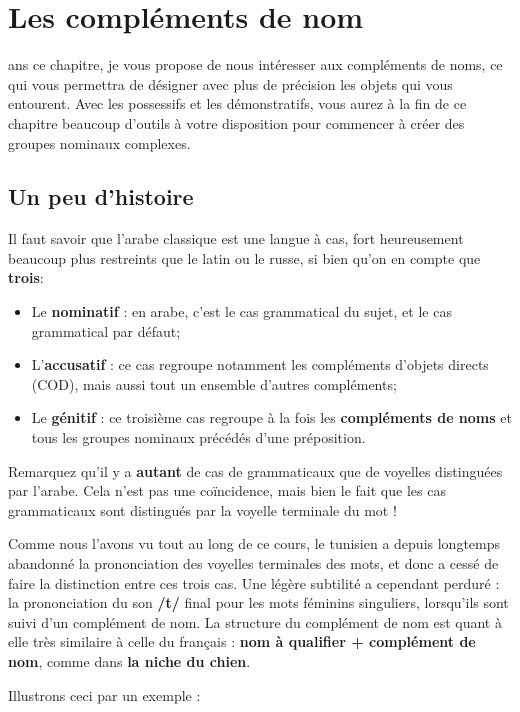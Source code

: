 \chapter{Les compléments de nom}
ans ce chapitre, je vous propose de nous intéresser aux compléments de noms, ce qui vous permettra de désigner avec plus de précision les objets qui vous entourent. Avec les possessifs et les démonstratifs, vous aurez à la fin de ce chapitre beaucoup d'outils à votre disposition pour commencer à créer des groupes nominaux complexes.

\section{Un peu d'histoire}
Il faut savoir que l'arabe classique est une langue à cas, fort heureusement beaucoup plus restreints que le latin ou le russe, si bien qu'on en compte que \textbf{trois}:

\begin{itemize}
    \item Le \textbf{nominatif} : en arabe, c'est le cas grammatical du sujet, et le cas grammatical par défaut;
    \item L'\textbf{accusatif} : ce cas regroupe notamment les compléments d'objets directs (COD), mais aussi tout un ensemble d'autres compléments;
    \item Le \textbf{génitif} : ce troisième cas regroupe à la fois les \textbf{compléments de noms} et tous les groupes nominaux précédés d'une préposition.
\end{itemize}

Remarquez qu'il y a \textbf{autant} de cas de grammaticaux que de voyelles distinguées par l'arabe. Cela n'est pas une coïncidence, mais bien le fait que les cas grammaticaux sont distingués par la voyelle terminale du mot !

Comme nous l'avons vu tout au long de ce cours, le tunisien a depuis longtemps abandonné la prononciation des voyelles terminales des mots, et donc a cessé de faire la distinction entre ces trois cas. Une légère subtilité a cependant perduré : la prononciation du son \textbf{/t/} final pour les mots féminins singuliers, lorsqu'ils sont suivi d'un complément de nom. La structure du complément de nom est quant à elle très similaire à celle du français : \textbf{nom à qualifier + complément de nom}, comme dans \textbf{la niche du chien}.

Illustrons ceci par un exemple : 

